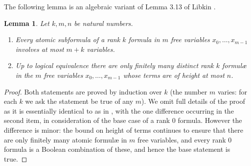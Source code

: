 \documentclass[reqno]{amsart}
\theoremstyle{plain}
\newtheorem{lem}[thm]{Lemma}
\theoremstyle{definition}
\begin{document}
The following lemma is an algebraic variant of Lemma 3.13 of Libkin \cite{lib}.
\begin{lem}\label{lem:tpfinite}
Let $k,m,n$ be natural numbers.
\begin{enumerate}
\item Every atomic subformula of a rank $k$ formula in $m$ free variables $x_0,\dots,x_{m-1}$ involves at most $m+k$ variables.
\item Up to logical equivalence there are only finitely many distinct rank $k$ formul{\ae} in the $m$ free variables $x_0,\dots,x_{m-1}$ whose terms are of height at most $n$.
\end{enumerate}
\end{lem}
\begin{proof}
Both statements are proved by induction over $k$ (the number $m$ varies: for each $k$ we ask the statement be true of any $m$).  We omit full details of the proof as it is essentially identical to as in \cite[Lemma~3.13]{lib}, with the one difference occurring in the second item, in consideration of the base case of a rank $0$ formula.  However the difference is minor: the bound on height of terms continues to ensure that there are only finitely many atomic formul{\ae} in $m$ free variables, and every rank $0$ formula is a Boolean combination of these, and hence the base statement is true.   \end{proof}
\end{document}
